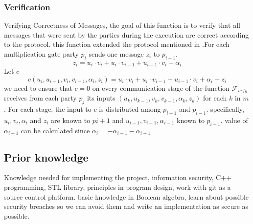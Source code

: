 \documentclass[12pt]{article}
\begin{document}
\subsubsection{Verification}
Verifying Correctness of Messages, the goal of this function is to verify that all messages that were sent by the parties during the execution are correct according to the protocol. this function extended the protocol mentioned in \cite{main_based}.\hfill\break For each multiplication gate party $p_i$ sends one message $z_i$ to $p_{i+1}$.
\begin{equation} \label{eq:1}
z_i = u_i \cdot v_i + u_i \cdot v_{i-1} + u_{i-1} \cdot v_i + \alpha_i
\end{equation}
Let $c$ 
\begin{equation} \label{eq:2}
c(u_i, u_{i-1}, v_i, v_{i-1}, \alpha_i, z_i) = u_i \cdot v_i + u_i \cdot v_{i-1} + u_{i-1} \cdot v_i + \alpha_i - z_i
\end{equation}
we need to ensure that $c = 0$ on every communication stage of the function 
$\mathcal{F}_{vrfy}$ receives from each party $p_j$ its inputs $(u_k, u_{k-1},v_k,v_{k-1},\alpha_k,z_k)$ for each $k$ in $m$.
For each stage, the input to $c$ is distributed among $p_{i+1}$ and $p_{i-1}$.  specifically, $u_i,v_i,\alpha_i$ and $z_i$ are known to $p{i+1}$ and $u_{i-1},v_{i-1}, \alpha_{i-1} $ known to $p_{i-1}$. value of $\alpha_{i-1}$ can be calculated since $\alpha_i = -\alpha_{i-1} - \alpha_{i+1}$ 

\subsection{Prior knowledge}
Knowledge needed for implementing the project, information security, C++ programming, STL library, principles in program design, work with git as a source control platform. basic knowledge in Boolean algebra, learn about possible security breaches so we can avoid them and write an implementation as secure as possible. 
\end{document}
